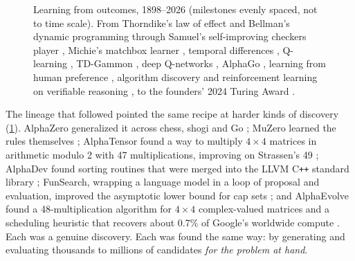\begin{figure}[t]
\centering
\makebox[\linewidth][c]{}
\caption{Learning from outcomes, 1898--2026 (milestones evenly spaced, not to time scale). From
Thorndike's law of effect \citep{thorndike1911} and Bellman's dynamic programming
\citep{bellman1957} through Samuel's self-improving checkers player \citep{samuel1959}, Michie's
matchbox learner \citep{michie1963menace}, temporal differences \citep{sutton1988td}, Q-learning
\citep{watkins1989}, TD-Gammon \citep{tesauro1992}, deep Q-networks \citep{mnih2015dqn}, AlphaGo
\citep{silver2016alphago,silver2017zero}, learning from human preference
\citep{christiano2017rlhf,ouyang2022instructgpt}, algorithm discovery
\citep{fawzi2022alphatensor,mankowitz2023alphadev,romeraparedes2024funsearch,novikov2025alphaevolve}
and reinforcement learning on verifiable reasoning \citep{openai2024o1,deepseek2025r1}, to the
founders' 2024 Turing Award \citep{acm2025turing}.}
\label{fig:timeline}
\end{figure}

The lineage that followed pointed the same recipe at harder kinds of discovery
(\cref{fig:timeline}). AlphaZero generalized it across chess, shogi and Go
\citep{silver2018alphazero}; MuZero learned the rules themselves \citep{schrittwieser2020muzero};
AlphaTensor found a way to multiply $4\times4$ matrices in arithmetic modulo 2 with 47
multiplications, improving on Strassen's 49 \citep{fawzi2022alphatensor}; AlphaDev found sorting
routines that were merged into the LLVM C\texttt{++} standard library
\citep{mankowitz2023alphadev}; FunSearch, wrapping a language model in a loop of proposal and
evaluation, improved the asymptotic lower bound for cap sets \citep{romeraparedes2024funsearch};
and AlphaEvolve found a 48-multiplication algorithm for $4\times4$ complex-valued matrices and a
scheduling heuristic that recovers about 0.7\% of Google's worldwide compute
\citep{novikov2025alphaevolve}. Each was a genuine discovery. Each was found the same way: by
generating and evaluating thousands to millions of candidates \emph{for the problem at hand}.

